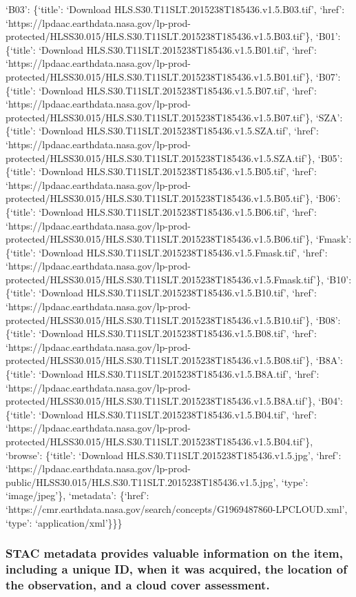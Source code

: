\documentclass[
  letterpaper,
]{scrartcl}
\begin{document}
`B03': \{`title': `Download HLS.S30.T11SLT.2015238T185436.v1.5.B03.tif',
`href':
`https://lpdaac.earthdata.nasa.gov/lp-prod-protected/HLSS30.015/HLS.S30.T11SLT.2015238T185436.v1.5.B03.tif'\},
`B01': \{`title': `Download HLS.S30.T11SLT.2015238T185436.v1.5.B01.tif',
`href':
`https://lpdaac.earthdata.nasa.gov/lp-prod-protected/HLSS30.015/HLS.S30.T11SLT.2015238T185436.v1.5.B01.tif'\},
`B07': \{`title': `Download HLS.S30.T11SLT.2015238T185436.v1.5.B07.tif',
`href':
`https://lpdaac.earthdata.nasa.gov/lp-prod-protected/HLSS30.015/HLS.S30.T11SLT.2015238T185436.v1.5.B07.tif'\},
`SZA': \{`title': `Download HLS.S30.T11SLT.2015238T185436.v1.5.SZA.tif',
`href':
`https://lpdaac.earthdata.nasa.gov/lp-prod-protected/HLSS30.015/HLS.S30.T11SLT.2015238T185436.v1.5.SZA.tif'\},
`B05': \{`title': `Download HLS.S30.T11SLT.2015238T185436.v1.5.B05.tif',
`href':
`https://lpdaac.earthdata.nasa.gov/lp-prod-protected/HLSS30.015/HLS.S30.T11SLT.2015238T185436.v1.5.B05.tif'\},
`B06': \{`title': `Download HLS.S30.T11SLT.2015238T185436.v1.5.B06.tif',
`href':
`https://lpdaac.earthdata.nasa.gov/lp-prod-protected/HLSS30.015/HLS.S30.T11SLT.2015238T185436.v1.5.B06.tif'\},
`Fmask': \{`title': `Download
HLS.S30.T11SLT.2015238T185436.v1.5.Fmask.tif', `href':
`https://lpdaac.earthdata.nasa.gov/lp-prod-protected/HLSS30.015/HLS.S30.T11SLT.2015238T185436.v1.5.Fmask.tif'\},
`B10': \{`title': `Download HLS.S30.T11SLT.2015238T185436.v1.5.B10.tif',
`href':
`https://lpdaac.earthdata.nasa.gov/lp-prod-protected/HLSS30.015/HLS.S30.T11SLT.2015238T185436.v1.5.B10.tif'\},
`B08': \{`title': `Download HLS.S30.T11SLT.2015238T185436.v1.5.B08.tif',
`href':
`https://lpdaac.earthdata.nasa.gov/lp-prod-protected/HLSS30.015/HLS.S30.T11SLT.2015238T185436.v1.5.B08.tif'\},
`B8A': \{`title': `Download HLS.S30.T11SLT.2015238T185436.v1.5.B8A.tif',
`href':
`https://lpdaac.earthdata.nasa.gov/lp-prod-protected/HLSS30.015/HLS.S30.T11SLT.2015238T185436.v1.5.B8A.tif'\},
`B04': \{`title': `Download HLS.S30.T11SLT.2015238T185436.v1.5.B04.tif',
`href':
`https://lpdaac.earthdata.nasa.gov/lp-prod-protected/HLSS30.015/HLS.S30.T11SLT.2015238T185436.v1.5.B04.tif'\},
`browse': \{`title': `Download HLS.S30.T11SLT.2015238T185436.v1.5.jpg',
`href':
`https://lpdaac.earthdata.nasa.gov/lp-prod-public/HLSS30.015/HLS.S30.T11SLT.2015238T185436.v1.5.jpg',
`type': `image/jpeg'\}, `metadata': \{`href':
`https://cmr.earthdata.nasa.gov/search/concepts/G1969487860-LPCLOUD.xml',
`type': `application/xml'\}\}\}

\hypertarget{stac-metadata-provides-valuable-information-on-the-item-including-a-unique-id-when-it-was-acquired-the-location-of-the-observation-and-a-cloud-cover-assessment.}{%
\subsubsection{STAC metadata provides valuable information on the item,
including a unique ID, when it was acquired, the location of the
observation, and a cloud cover
assessment.}\label{stac-metadata-provides-valuable-information-on-the-item-including-a-unique-id-when-it-was-acquired-the-location-of-the-observation-and-a-cloud-cover-assessment.}}
\end{document}
